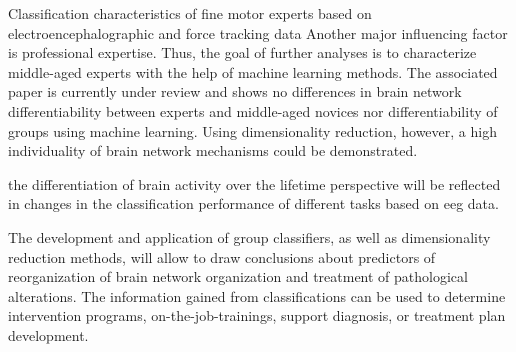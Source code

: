 Classification characteristics of fine motor experts based on electroencephalographic and force tracking data
Another major influencing factor is professional expertise. Thus, the goal of further analyses is to characterize middle-aged experts with the help of machine learning methods. The associated paper is currently under review and shows no differences in brain network differentiability between experts and middle-aged novices nor differentiability of groups using machine learning. Using dimensionality reduction, however, a high individuality of brain network mechanisms could be demonstrated. 

the differentiation of brain activity over the lifetime perspective will be reflected in changes in the classification performance of different tasks based on \gls{eeg} data. 



The development and application of group classifiers, as well as dimensionality reduction methods, will allow to draw conclusions about predictors of reorganization of brain network organization and treatment of pathological alterations. The information gained from classifications can be used to determine intervention programs, on-the-job-trainings, support diagnosis, or treatment plan development. 